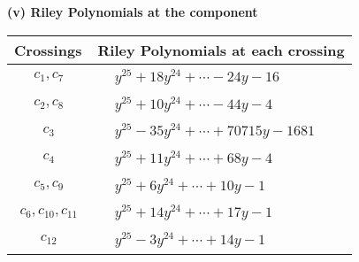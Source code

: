 \documentclass[1p]{elsarticle_modified}
\theoremstyle{definition}
\begin{document}
\newpage\renewcommand{\arraystretch}{1}
\flushleft \textbf{(v) Riley Polynomials at the component}\newline \\
\begin{tabular}{m{50pt}|m{274pt}}
Crossings & \hspace{64pt}Riley Polynomials at each crossing \\
\hline $$\begin{aligned}c_{1},c_{7}\end{aligned}$$&$\begin{aligned}
&y^{25}+18 y^{24}+\cdots-24 y-16
\end{aligned}$\\
\hline $$\begin{aligned}c_{2},c_{8}\end{aligned}$$&$\begin{aligned}
&y^{25}+10 y^{24}+\cdots-44 y-4
\end{aligned}$\\
\hline $$\begin{aligned}c_{3}\end{aligned}$$&$\begin{aligned}
&y^{25}-35 y^{24}+\cdots+70715 y-1681
\end{aligned}$\\
\hline $$\begin{aligned}c_{4}\end{aligned}$$&$\begin{aligned}
&y^{25}+11 y^{24}+\cdots+68 y-4
\end{aligned}$\\
\hline $$\begin{aligned}c_{5},c_{9}\end{aligned}$$&$\begin{aligned}
&y^{25}+6 y^{24}+\cdots+10 y-1
\end{aligned}$\\
\hline $$\begin{aligned}c_{6},c_{10},c_{11}\end{aligned}$$&$\begin{aligned}
&y^{25}+14 y^{24}+\cdots+17 y-1
\end{aligned}$\\
\hline $$\begin{aligned}c_{12}\end{aligned}$$&$\begin{aligned}
&y^{25}-3 y^{24}+\cdots+14 y-1
\end{aligned}$\\
\hline
\end{tabular}\\~\\
\end{document}
